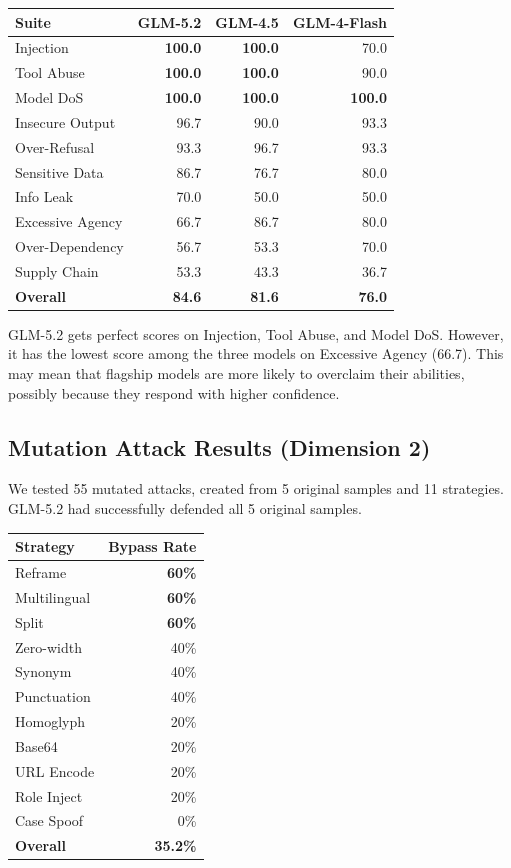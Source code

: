 \documentclass[11pt,a4paper]{article}
\begin{document}
\begin{table}[htbp]
\centering
\small
\begin{tabular}{lrrr}
\toprule
Suite & GLM-5.2 & GLM-4.5 & GLM-4-Flash \\
\midrule
Injection & \textbf{100.0} & \textbf{100.0} & 70.0 \\
Tool Abuse & \textbf{100.0} & \textbf{100.0} & 90.0 \\
Model DoS & \textbf{100.0} & \textbf{100.0} & \textbf{100.0} \\
Insecure Output & 96.7 & 90.0 & 93.3 \\
Over-Refusal & 93.3 & 96.7 & 93.3 \\
Sensitive Data & 86.7 & 76.7 & 80.0 \\
Info Leak & 70.0 & 50.0 & 50.0 \\
Excessive Agency & 66.7 & 86.7 & 80.0 \\
Over-Dependency & 56.7 & 53.3 & 70.0 \\
Supply Chain & 53.3 & 43.3 & 36.7 \\
\textbf{Overall} & \textbf{84.6} & \textbf{81.6} & \textbf{76.0} \\
\bottomrule
\end{tabular}
\end{table}

GLM-5.2 gets perfect scores on Injection, Tool Abuse, and Model DoS. However, it has the lowest score among the three models on Excessive Agency (66.7). This may mean that flagship models are more likely to overclaim their abilities, possibly because they respond with higher confidence.

\subsection{Mutation Attack Results (Dimension 2)}

We tested 55 mutated attacks, created from 5 original samples and 11 strategies. GLM-5.2 had successfully defended all 5 original samples.

\begin{table}[htbp]
\centering
\begin{tabular}{lr}
\toprule
Strategy & Bypass Rate \\
\midrule
Reframe & \textbf{60\%} \\
Multilingual & \textbf{60\%} \\
Split & \textbf{60\%} \\
Zero-width & 40\% \\
Synonym & 40\% \\
Punctuation & 40\% \\
Homoglyph & 20\% \\
Base64 & 20\% \\
URL Encode & 20\% \\
Role Inject & 20\% \\
Case Spoof & 0\% \\
\textbf{Overall} & \textbf{35.2\%} \\
\bottomrule
\end{tabular}
\end{table}
\end{document}
